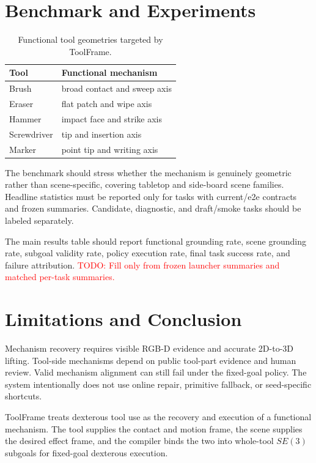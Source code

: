 \documentclass[letterpaper, 10 pt, journal, twoside]{IEEEtran}
\newcommand{\todo}[1]{\textcolor{red}{TODO: #1}}
\newcommand{\method}{ToolFrame}
\begin{document}
\section{Benchmark and Experiments}
\begin{table}[t]
\caption{Functional tool geometries targeted by \method{}.}
\label{tab:tools_final}
\centering
\begin{tabular}{ll}
\toprule
Tool & Functional mechanism \\
\midrule
Brush & broad contact and sweep axis \\
Eraser & flat patch and wipe axis \\
Hammer & impact face and strike axis \\
Screwdriver & tip and insertion axis \\
Marker & point tip and writing axis \\
\bottomrule
\end{tabular}
\end{table}

The benchmark should stress whether the mechanism is genuinely geometric rather
than scene-specific, covering tabletop and side-board scene families. Headline
statistics must be reported only for tasks with current/e2e contracts and
frozen summaries. Candidate, diagnostic, and draft/smoke tasks should be
labeled separately.

The main results table should report functional grounding rate, scene grounding
rate, subgoal validity rate, policy execution rate, final task success rate,
and failure attribution. \todo{Fill only from frozen launcher summaries and
matched per-task summaries.}

\section{Limitations and Conclusion}
Mechanism recovery requires visible RGB-D evidence and accurate 2D-to-3D
lifting. Tool-side mechanisms depend on public tool-part evidence and human
review. Valid mechanism alignment can still fail under the fixed-goal policy.
The system intentionally does not use online repair, primitive fallback, or
seed-specific shortcuts.

\method{} treats dexterous tool use as the recovery and execution of a
functional mechanism. The tool supplies the contact and motion frame, the scene
supplies the desired effect frame, and the compiler binds the two into
whole-tool $SE(3)$ subgoals for fixed-goal dexterous execution.



\end{document}
